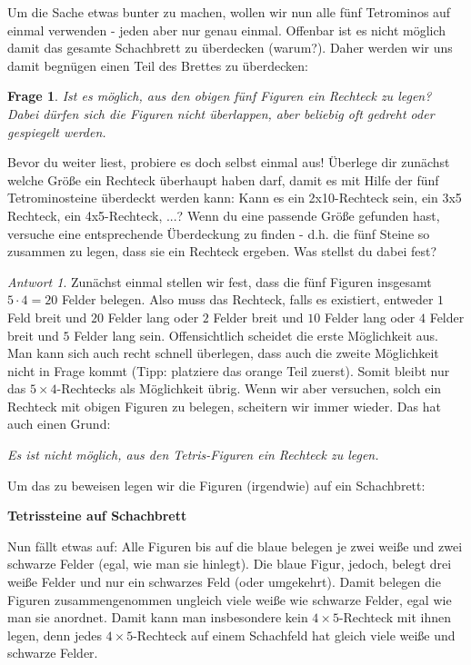 \documentclass[a4paper,ngerman,12pt]{scrartcl}
\theoremstyle{definition}
\theoremstyle{plain}
\newtheorem{frage}[defn]{Frage}
\theoremstyle{remark}
\newtheorem*{antwort}{Antwort}
\begin{document}
Um die Sache etwas bunter zu machen, wollen wir nun alle fünf Tetrominos auf einmal verwenden - jeden aber nur genau einmal. Offenbar ist es nicht möglich damit das gesamte Schachbrett zu überdecken (warum?). Daher werden wir uns damit begnügen einen Teil des Brettes zu überdecken:

\begin{frage}
	Ist es möglich, aus den obigen fünf Figuren ein Rechteck zu legen? Dabei dürfen sich die Figuren nicht überlappen, aber beliebig oft gedreht oder gespiegelt werden.
\end{frage}

Bevor du weiter liest, probiere es doch selbst einmal aus! Überlege dir zunächst welche Größe ein Rechteck überhaupt haben darf, damit es mit Hilfe der fünf Tetrominosteine überdeckt werden kann: Kann es ein 2x10-Rechteck sein, ein 3x5 Rechteck, ein 4x5-Rechteck, ...? Wenn du eine passende Größe gefunden hast, versuche eine entsprechende Überdeckung zu finden - d.h. die fünf Steine so zusammen zu legen, dass sie ein Rechteck ergeben. Was stellst du dabei fest?

\begin{antwort}
	Zunächst einmal stellen wir fest, dass die fünf Figuren insgesamt $5 \cdot 4 = 20$ Felder belegen. Also muss das Rechteck, falls es existiert, entweder $1$ Feld breit und $20$ Felder lang oder $2$ Felder breit und $10$ Felder lang oder $4$ Felder breit und $5$ Felder lang sein. Offensichtlich scheidet die erste Möglichkeit aus. Man kann sich auch recht schnell überlegen, dass auch die zweite Möglichkeit nicht in Frage kommt (Tipp: platziere das orange Teil zuerst). Somit bleibt nur das $5 \times 4$-Rechtecks als Möglichkeit übrig. Wenn wir aber versuchen, solch ein Rechteck mit obigen Figuren zu belegen, scheitern wir immer wieder. Das hat auch einen Grund:
	
	\emph{Es ist nicht möglich, aus den Tetris-Figuren ein Rechteck zu legen.}
	
	Um das zu beweisen legen wir die Figuren (irgendwie) auf ein Schachbrett:
	
	\textbf{Tetrissteine auf Schachbrett}	
	
	Nun fällt etwas auf: Alle Figuren bis auf die blaue belegen je zwei weiße und zwei schwarze Felder (egal, wie man sie hinlegt). Die blaue Figur, jedoch, belegt drei weiße Felder und nur ein schwarzes Feld (oder umgekehrt). Damit belegen die Figuren zusammengenommen ungleich viele weiße wie schwarze Felder, egal wie man sie anordnet. Damit kann man insbesondere kein $4 \times 5$-Rechteck mit ihnen legen, denn jedes $4 \times 5$-Rechteck auf einem Schachfeld hat gleich viele weiße und schwarze Felder.
\end{antwort}
\end{document}
